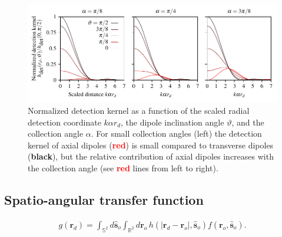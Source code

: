 \documentclass{osa-article}
\providecommand{\ro}{\mathbf{\mathbf{r}}_o}
\providecommand{\so}{\mathbf{\hat{s}}_o}
\providecommand{\rd}{\mathbf{r}_d}
\providecommand{\mbb}[1]{\mathbb{#1}}
\begin{document}
\begin{figure}[h]
 \centering
   \centering
   \includegraphics[scale=0.8]{../figures/detection/detection.pdf}
   \caption{Normalized detection kernel as a function of the scaled radial
     detection coordinate $k\alpha r_d$, the dipole inclination angle
     $\vartheta$, and the collection angle $\alpha$. For small collection angles
     (left) the detection kernel of axial dipoles
     (\textcolor{red}{\textbf{red}}) is small compared to transverse dipoles
     (\textbf{black}), but the relative contribution of axial dipoles increases
     with the collection angle (see \textcolor{red}{\textbf{red}} lines from left to right).}
   \label{fig:microscope}
 \end{figure}
 


 \subsection{Spatio-angular transfer function}\label{sec:trans}
 \begin{align}
g(\rd{}) = \int_{\mbb{S}^2}d\so{}\int_{\mbb{R}^2}d\ro{}\, h(|\rd{} -\ro{}|, \so{})f(\ro, \so).
 \end{align}
\end{document}
